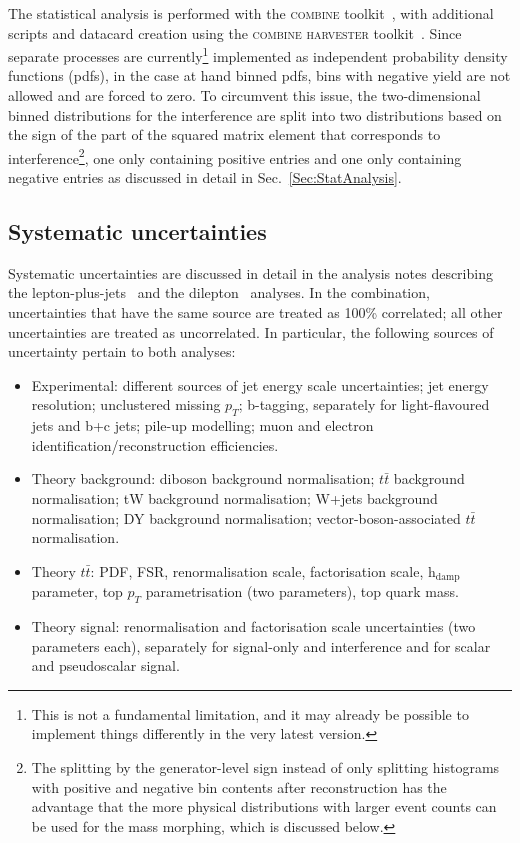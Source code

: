 The statistical analysis is performed with the \textsc{combine} toolkit~\cite{Wiki:Combine}, with additional scripts and datacard creation using the \textsc{combine harvester} toolkit~\cite{Wiki:CombineHarvester}. Since separate processes are currently\footnote{This is not a fundamental limitation, and it may already be possible to implement things differently in the very latest version.} implemented as independent probability density functions (pdfs), in the case at hand binned pdfs, bins with negative yield are not allowed and are forced to zero.
To circumvent this issue, the two-dimensional binned distributions for the interference are split into two distributions based on the sign of the part of the squared matrix element that corresponds to interference\footnote{The splitting by the generator-level sign instead of only splitting histograms with positive and negative bin contents after reconstruction has the advantage that the more physical distributions with larger event counts can be used for the mass morphing, which is discussed below.}, one only containing positive entries and one only containing negative entries as discussed in detail in Sec.~\ref{Sec:StatAnalysis}.

\subsection{Systematic uncertainties}

Systematic uncertainties are discussed in detail in the analysis notes describing the lepton-plus-jets~\cite{CMS-AN-16-272} and the dilepton~\cite{CMS-AN-16-164} analyses.
In the combination, uncertainties that have the same source are treated as 100\% correlated; all other uncertainties are treated as uncorrelated.
In particular, the following sources of uncertainty pertain to both analyses:

\begin{itemize}
        \item Experimental: different sources of jet energy scale uncertainties; jet energy resolution; unclustered missing $p_{T}$; b-tagging, separately for light-flavoured jets and b+c jets; pile-up modelling; muon and electron identification/reconstruction efficiencies.
        \item Theory background: diboson background normalisation; $t\bar t$ background normalisation; tW background normalisation; W+jets background normalisation; DY background normalisation; vector-boson-associated $t\bar t$ normalisation.
        \item Theory $t\bar t$: PDF, FSR, renormalisation scale, factorisation scale, h$_\text{damp}$ parameter, top $p_{T}$ parametrisation (two parameters), top quark mass.
        \item Theory signal: renormalisation and factorisation scale uncertainties (two parameters each), separately for signal-only and interference and for scalar and pseudoscalar signal.
\end{itemize}

